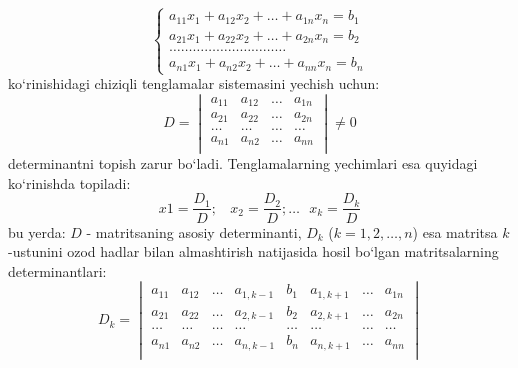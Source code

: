 $$
\begin{cases} 
	a_{11}x_{1}+a_{12}x_{2}+\ldots+a_{1n}x_{n}=b_{1} \\ 
	a_{21}x_{1}+a_{22}x_{2}+\ldots+a_{2n}x_{n}=b_{2} \\ 
	\ldots \ldots\ldots\ldots\ldots\ldots\ldots\ldots\ldots\ldots\\
	a_{n1}x_{1}+a_{n2}x_{2}+\ldots+a_{nn}x_{n}=b_{n}
\end{cases} 
$$
ko`rinishidagi chiziqli tenglamalar sistemasini yechish uchun:
$$
D=
\begin{vmatrix}
	a_{11}&a_{12}&\ldots&a_{1n}\\
	a_{21}&a_{22}&\ldots&a_{2n}\\
	\ldots&\ldots&\ldots&\ldots\\
	a_{n1}&a_{n2}&\ldots&a_{nn}\\
\end{vmatrix}\ne 0
$$ 
determinantni topish zarur bo`ladi. Tenglamalarning yechimlari esa quyidagi ko`rinishda topiladi:
\begin{equation*}
	x{1}=\frac{D_{1}}{D};\ \ \ \ x_{2}=\frac{D_{2}}{D};\ldots \ \ \ x_{k}=\frac{D_{k}}{D}
\end{equation*} 
bu yerda: $D$ - matritsaning asosiy determinanti, $D_{k}$ ($k=1,2,\ldots,n$) esa matritsa $k$-ustunini ozod hadlar bilan almashtirish natijasida hosil bo`lgan matritsalarning determinantlari:
\begin{equation*}
	D_{k}=\begin{vmatrix}
		a_{11}&a_{12}&\ldots&a_{1,k-1}&b_{1}&a_{1,k+1}&\ldots&a_{1n}\\
		a_{21}&a_{22}&\ldots&a_{2,k-1}&b_{2}&a_{2,k+1}&\ldots&a_{2n}\\
		\ldots&\ldots&\ldots&\ldots&\ldots&\ldots&\ldots&\ldots\\
		a_{n1}&a_{n2}&\ldots&a_{n,k-1}&b_{n}&a_{n,k+1}&\ldots&a_{nn}\\
	\end{vmatrix}
\end{equation*}


